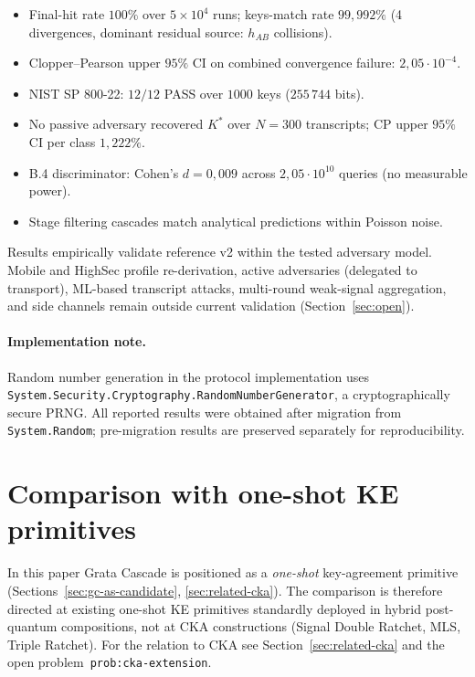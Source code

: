 \documentclass[11pt,a4paper]{article}
\begin{document}
\begin{itemize}[leftmargin=*]
\item Final-hit rate $100\%$ over $5 \times 10^4$ runs; keys-match rate $99{,}992\%$ (4 divergences, dominant residual source: $h_{AB}$ collisions).
\item Clopper--Pearson upper $95\%$ CI on combined convergence failure: $2{,}05 \cdot 10^{-4}$.
\item NIST SP 800-22: $12/12$ PASS over $1000$ keys ($255\,744$ bits).
\item No passive adversary recovered $K^*$ over $N = 300$ transcripts; CP upper $95\%$ CI per class $1{,}222\%$.
\item B.4 discriminator: Cohen's $d = 0{,}009$ across $2{,}05 \cdot 10^{10}$ queries (no measurable power).
\item Stage filtering cascades match analytical predictions within Poisson noise.
\end{itemize}

Results empirically validate reference v2 within the tested adversary model. Mobile and HighSec profile re-derivation, active adversaries (delegated to transport), ML-based transcript attacks, multi-round weak-signal aggregation, and side channels remain outside current validation (Section~\ref{sec:open}).

\paragraph{Implementation note.} Random number generation in the protocol implementation uses \texttt{System.Security.Cryptography.RandomNumberGenerator}, a cryptographically secure PRNG. All reported results were obtained after migration from \texttt{System.Random}; pre-migration results are preserved separately for reproducibility.

\section{Comparison with one-shot KE primitives}\label{sec:comparison}

In this paper Grata Cascade is positioned as a \emph{one-shot} key-agreement primitive (Sections~\ref{sec:gc-as-candidate}, \ref{sec:related-cka}). The comparison is therefore directed at existing one-shot KE primitives standardly deployed in hybrid post-quantum compositions, not at CKA constructions (Signal Double Ratchet, MLS, Triple Ratchet). For the relation to CKA see Section~\ref{sec:related-cka} and the open problem~\texttt{prob:cka-extension}.
\end{document}
